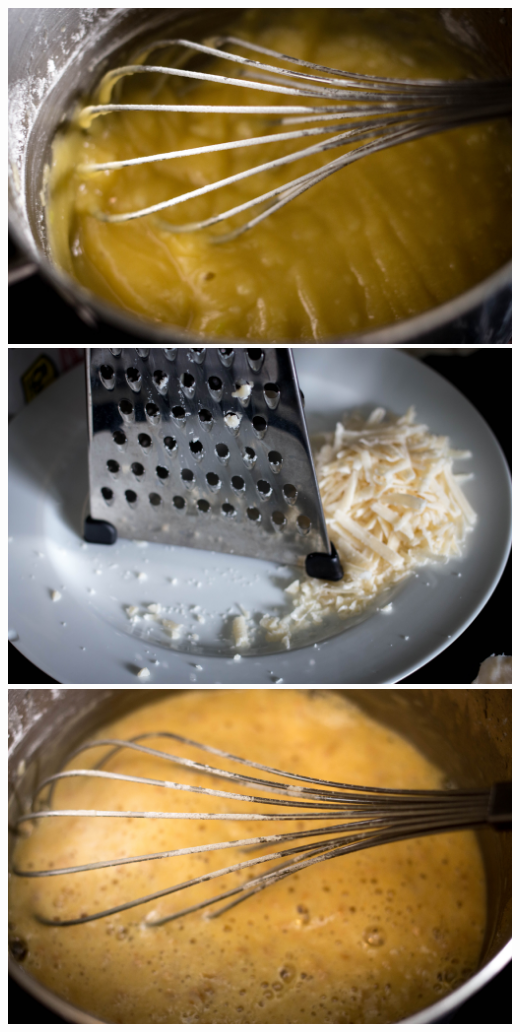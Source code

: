 \newpage
\includegraphics[width=\textwidth]{food/mac-n-cheese/images/hi-res/04.jpg}
\newpage
\includegraphics[width=\textwidth]{food/mac-n-cheese/images/hi-res/05.jpg}
\newpage
\includegraphics[width=\textwidth]{food/mac-n-cheese/images/hi-res/06.jpg}
